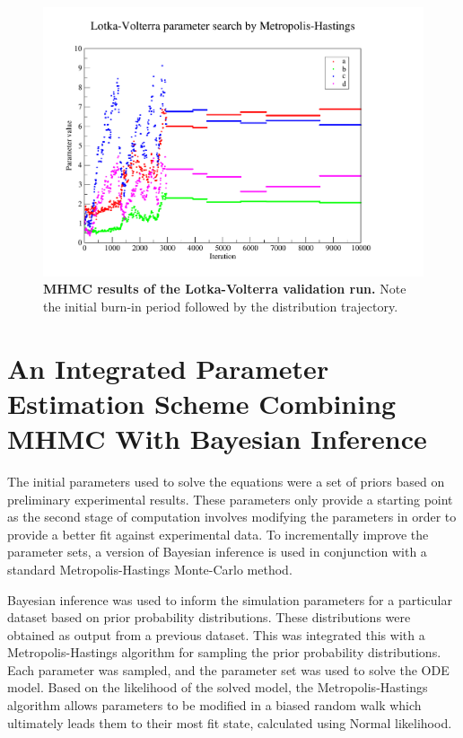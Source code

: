 \begin{figure}[tbp]
 \centering
 \includegraphics[width=13cm, trim=50px 35px 125px 30px, clip=true]{./03-parameterestimationmethodologies/data/LV_MCMC.pdf}
 \caption[{MHMC results of the Lotka-Volterra validation run.}]{{\bf MHMC results of the Lotka-Volterra validation run.} Note the initial burn-in period followed by the distribution trajectory.
 \label{fig:parameters}}
\end{figure}
\afterpage{\clearpage}

\section{An Integrated Parameter Estimation Scheme Combining MHMC With Bayesian Inference}
The initial parameters used to solve the equations were a set of priors based on preliminary experimental results. These parameters only provide a starting point as the second stage of computation involves modifying the parameters in order to provide a better fit against experimental data. To incrementally improve the parameter sets, a version of Bayesian inference is used in conjunction with a standard Metropolis-Hastings Monte-Carlo method.

Bayesian inference was used to inform the simulation parameters for a particular dataset based on prior probability distributions. These distributions were obtained as output from a previous dataset. This was integrated this with a Metropolis-Hastings algorithm for sampling the prior probability distributions. Each parameter was sampled, and the parameter set was used to solve the ODE model. Based on the likelihood of the solved model, the Metropolis-Hastings algorithm allows parameters to be modified in a biased random walk which ultimately leads them to their most fit state, calculated using Normal likelihood.

